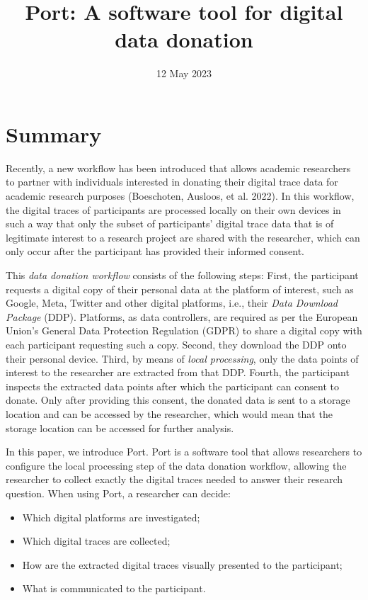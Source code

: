 \documentclass[
]{article}
\title{Port: A software tool for digital data donation}
\author{}
\date{\vspace{-2.5em}12 May 2023}
\providecommand{\tightlist}{%
  \setlength{\itemsep}{0pt}\setlength{\parskip}{0pt}}
\begin{document}
\maketitle

\hypertarget{summary}{%
\section{Summary}\label{summary}}

Recently, a new workflow has been introduced that allows academic
researchers to partner with individuals interested in donating their
digital trace data for academic research purposes (Boeschoten, Ausloos,
et al. 2022). In this workflow, the digital traces of participants are
processed locally on their own devices in such a way that only the
subset of participants' digital trace data that is of legitimate
interest to a research project are shared with the researcher, which can
only occur after the participant has provided their informed consent.

This \emph{data donation workflow} consists of the following steps:
First, the participant requests a digital copy of their personal data at
the platform of interest, such as Google, Meta, Twitter and other
digital platforms, i.e., their \emph{Data Download Package} (DDP).
Platforms, as data controllers, are required as per the European Union's
General Data Protection Regulation (GDPR) to share a digital copy with
each participant requesting such a copy. Second, they download the DDP
onto their personal device. Third, by means of \emph{local processing},
only the data points of interest to the researcher are extracted from
that DDP. Fourth, the participant inspects the extracted data points
after which the participant can consent to donate. Only after providing
this consent, the donated data is sent to a storage location and can be
accessed by the researcher, which would mean that the storage location
can be accessed for further analysis.

In this paper, we introduce Port. Port is a software tool that allows
researchers to configure the local processing step of the data donation
workflow, allowing the researcher to collect exactly the digital traces
needed to answer their research question. When using Port, a researcher
can decide:

\begin{itemize}
\tightlist
\item
  Which digital platforms are investigated;
\item
  Which digital traces are collected;
\item
  How are the extracted digital traces visually presented to the
  participant;
\item
  What is communicated to the participant.
\end{itemize}
\end{document}
